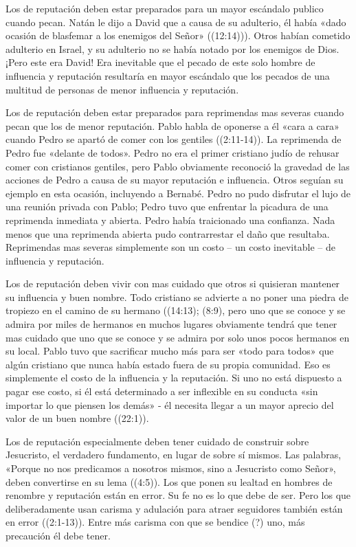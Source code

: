 \documentclass[12pt, twoside, openright]{book}
\begin{document}
Los de reputación deben estar preparados para un mayor escándalo publico cuando pecan. Natán le dijo a David que a causa de su adulterio, él había «dado ocasión de blasfemar a los enemigos del Señor» ((12:14))). Otros habían cometido adulterio en Israel, y su adulterio no se había notado por los enemigos de Dios. ¡Pero este era David! Era inevitable que el pecado de este solo hombre de influencia y reputación resultaría en mayor escándalo que los pecados de una multitud de personas de menor influencia y reputación.

Los de reputación deben estar preparados para reprimendas mas severas cuando pecan que los de menor reputación. Pablo habla de oponerse a él «cara a cara» cuando Pedro se apartó de comer con los gentiles ((2:11-14)). La reprimenda de Pedro fue «delante de todos». Pedro no era el primer cristiano judío de rehusar comer con cristianos gentiles, pero Pablo obviamente reconoció la gravedad de las acciones de Pedro a causa de su mayor reputación e influencia. Otros seguían su ejemplo en esta ocasión, incluyendo a Bernabé. Pedro no pudo disfrutar el lujo de una reunión privada con Pablo; Pedro tuvo que enfrentar la picadura de una reprimenda inmediata y abierta. Pedro había traicionado una confianza. Nada menos que una reprimenda abierta pudo contrarrestar el daño que resultaba. Reprimendas mas severas simplemente son un costo – un costo inevitable – de influencia y reputación.

Los de reputación deben vivir con mas cuidado que otros si quisieran mantener su influencia y buen nombre. Todo cristiano se advierte a no poner una piedra de tropiezo en el camino de su hermano ((14:13); (8:9), pero uno que se conoce y se admira por miles de hermanos en muchos lugares obviamente tendrá que tener mas cuidado que uno que se conoce y se admira por solo unos pocos hermanos en su local. Pablo tuvo que sacrificar mucho más para ser «todo para todos» que algún cristiano que nunca había estado fuera de su propia comunidad. Eso es simplemente el costo de la influencia y la reputación. Si uno no está dispuesto a pagar ese costo, si él está determinado a ser inflexible en su conducta «sin importar lo que piensen los demás» - él necesita llegar a un mayor aprecio del valor de un buen nombre ((22:1)).

Los de reputación especialmente deben tener cuidado de construir sobre Jesucristo, el verdadero fundamento, en lugar de sobre sí mismos. Las palabras, «Porque no nos predicamos a nosotros mismos, sino a Jesucristo como Señor», deben convertirse en su lema ((4:5)). Los que ponen su lealtad en hombres de renombre y reputación están en error. Su fe no es lo que debe de ser. Pero los que deliberadamente usan carisma y adulación para atraer seguidores también están en error ((2:1-13)). Entre más carisma con que se bendice (?) uno, más precaución él debe tener.
\end{document}
